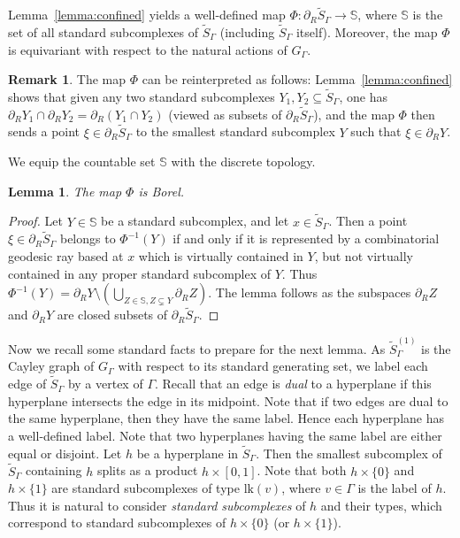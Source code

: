 \documentclass[11pt]{article}
\numberwithin{equation}{section}
\theoremstyle{plain}
\newtheorem{lemma}[theo]{Lemma}
\theoremstyle{definition}
\newtheorem{rk}[theo]{Remark}
\newcommand{\lk}{\mathrm{lk}}
\begin{document}
Lemma~\ref{lemma:confined} yields a well-defined map $\Phi:\partial_R \widetilde{S}_\Gamma\to \mathbb{S}$, where $\mathbb{S}$ is the set of all standard subcomplexes of $\widetilde{S}_\Gamma$ (including $\widetilde{S}_\Gamma$ itself). Moreover, the map $\Phi$ is equivariant with respect to the natural actions of $G_\Gamma$.

\begin{rk}
The map $\Phi$ can be reinterpreted as follows: Lemma~\ref{lemma:confined} shows that given any two standard subcomplexes $Y_1,Y_2\subseteq\widetilde{S}_\Gamma$, one has $\partial_R Y_1\cap\partial_R Y_2=\partial_R(Y_1\cap Y_2)$ (viewed as subsets of $\partial_R\widetilde{S}_\Gamma$), and the map $\Phi$ then sends a point $\xi\in\partial_R\widetilde{S}_\Gamma$ to the smallest standard subcomplex $Y$ such that $\xi\in\partial_RY$.
\end{rk}

We equip the countable set $\mathbb{S}$ with the discrete topology.

\begin{lemma}
\label{lem:borel}
The map $\Phi$ is Borel.
\end{lemma}

\begin{proof}
Let $Y\in \mathbb {S}$ be a standard subcomplex, and let $x\in \widetilde{S}_\Gamma$. Then a point $\xi\in\partial_R\widetilde{S}_\Gamma$ belongs to $\Phi^{-1}(Y)$ if and only if it is represented by a combinatorial geodesic ray based at $x$ which is virtually contained in $Y$, but not virtually contained in any proper standard subcomplex of $Y$. Thus $\Phi^{-1}(Y)=\partial_R Y\setminus(\bigcup_{Z\in \mathbb {S}, Z\subsetneq Y}\partial_R Z)$. The lemma follows as the subspaces $\partial_R Z$ and $\partial_R Y$ are closed subsets of $\partial_R \widetilde{S}_\Gamma$.
\end{proof}

Now we recall some standard facts to prepare for the next lemma. As $\widetilde{S}^{(1)}_\Gamma$ is the Cayley graph of $G_\Gamma$ with respect to its standard generating set, we label each edge of $\widetilde{S}_\Gamma$ by a vertex of $\Gamma$. Recall that an edge is \emph{dual} to a hyperplane if this hyperplane intersects the edge in its midpoint. Note that if two edges are dual to the same hyperplane, then they have the same label. Hence each hyperplane has a well-defined label. Note that two hyperplanes having the same label are either equal or disjoint. Let $h$ be a hyperplane in $\widetilde{S}_\Gamma$. Then the smallest subcomplex of $\widetilde{S}_\Gamma$ containing $h$ splits as a product $h\times [0,1]$. Note that both $h\times\{0\}$ and $h\times\{1\}$ are standard subcomplexes of type $\lk(v)$, where $v\in \Gamma$ is the label of $h$. Thus it is natural to consider \emph{standard subcomplexes} of $h$ and their types, which correspond to standard subcomplexes of $h\times\{0\}$ (or $h\times\{1\}$).
\end{document}
